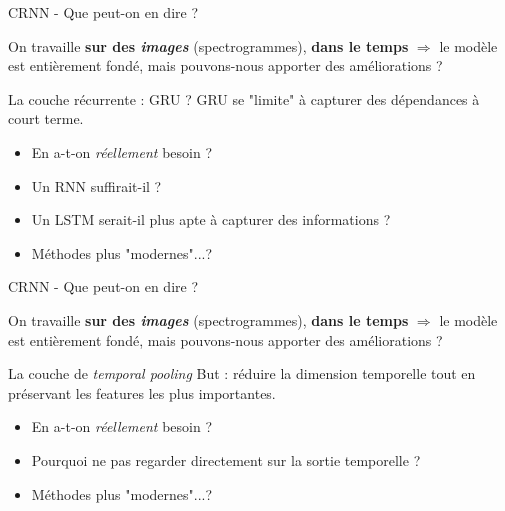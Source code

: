 \documentclass[compress,xcolor=table]{beamer}
\begin{document}
\begin{frame}{CRNN - Que peut-on en dire ?}

    On travaille \textbf{sur des \textit{images}} (spectrogrammes), \textbf{dans le temps} $\Rightarrow$ le modèle est entièrement fondé, mais pouvons-nous apporter des améliorations ?

    \begin{block}{La couche récurrente : GRU ?}
        GRU se "limite" à capturer des dépendances à court terme.

        \begin{itemize}
            \item En a-t-on \textit{réellement} besoin ?
            \item Un RNN suffirait-il ?
            \item Un LSTM serait-il plus apte à capturer des informations ?
            \item Méthodes plus "modernes"...?
        \end{itemize}

    \end{block}

\end{frame}

\begin{frame}{CRNN - Que peut-on en dire ?}

    On travaille \textbf{sur des \textit{images}} (spectrogrammes), \textbf{dans le temps} $\Rightarrow$ le modèle est entièrement fondé, mais pouvons-nous apporter des améliorations ?

    \begin{block}{La couche de \textit{temporal pooling}}
        But : réduire la dimension temporelle tout en préservant les features les plus importantes.

        \begin{itemize}
            \item En a-t-on \textit{réellement} besoin ?
            \item Pourquoi ne pas regarder directement sur la sortie temporelle ?
            \item Méthodes plus "modernes"...?
        \end{itemize}
    \end{block}

\end{frame}
\end{document}
